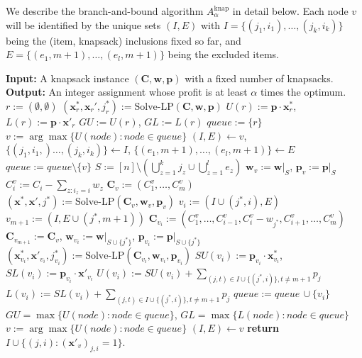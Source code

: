 \documentclass[a4paper,UKenglish,cleveref, autoref, thm-restate, pdfa]{lipics-v2021}
\theoremstyle{plain}
\begin{document}
We describe the branch-and-bound algorithm $A^{\text{knap}}_{\alpha}$ in detail below. Each node $v$ will be identified by the unique sets $(I, E)$ with $I = \{(j_1,i_1), \ldots, (j_k, i_k)\}$ being the (item, knapsack) inclusions fixed so far, and $E=\{(e_1,m+1), \ldots, (e_l,m+1)\}$ being the excluded items.

\begin{algorithm}
\caption{$A^{\text{knap}}_{\alpha}$}
\label{alg:knapsack}
\begin{algorithmic}[1]
    \State \textbf{Input:} A knapsack instance $(\bm{C}, \bm{w}, \bm{p})$ with a fixed number of knapsacks.
    \State \textbf{Output:} An integer assignment whose profit is at least $\alpha$ times the optimum.
    \State $r := (\emptyset, \emptyset)$
    \State $(\bm{x}^* _r, \bm{x}_r ', j^* _r) := \text{Solve-LP}(\bm{C, \bm{w}, \bm{p}})$
    \State $U(r):= \bm{p}\cdot \bm{x}^* _r$, $L(r):= \bm{p}\cdot \bm{x}' _r$
    \State $GU := U(r)$, $GL := L(r)$
    \State $queue :=  \{r\}$
        \State $v := \arg\max \{U(node): node \in queue\}$
        \State $(I, E) \leftarrow v$, $\{(j_1, i_1, )\ldots, (j_k, i_k)\} \leftarrow I$, $\{(e_1, m+1), \ldots, (e_l, m+1)\} \leftarrow E$
        \State $queue := queue \setminus \{v\}$
        \State $S := [n]\setminus \left(\bigcup_{z=1}^k j_z \cup \bigcup_{z=1}^l e_z\right)$
        \State $\bm{w}_v := \bm{w}|_{S}$, $\bm{p}_v := \bm{p}|_{S}$
            \State $C^v_i := C_i - \sum\limits_{z: i_z = i} w_z$
        \EndFor
        \State $\bm{C}_v := (C^v _1, \ldots, C^v _m)$
        \State $(\bm{x^*}, \bm{x}', j^*):= \text{Solve-LP}(\bm{C}_v, \bm{w}_v, \bm{p}_v)$
            \State $v_i := (I\cup (j^*, i), E)$
        \EndFor
        \State $v_{m+1} := (I, E\cup (j^*, m+1))$
            \State $\bm{C}_{v_i} := (C^v _1, \ldots, C^v _{i-1}, C^v_i - w_{j^*}, C^v_{i+1}, \ldots, C^v_m)$
        \EndFor
        \State $\bm{C}_{v_{m+1}} := \bm{C}_v$, 
            \State $\bm{w}_{v_i} := \bm{w} |_{S \cup \{j^*\}}$, $\bm{p}_{v_i} := \bm{p} |_{S \cup \{j^*\}}$
            \State $(\bm{x}^* _{v_i}, \bm{x}' _{v_i}, j^*_{v_i}) := \text{Solve-LP}(\bm{C}_{v_i}, \bm{w}_{v_i}, \bm{p}_{v_i})$
            \State $SU(v_i) := \bm{p}_{v_i} \cdot \bm{x}^* _{v_i}$, $SL(v_i) := \bm{p}_{v_i} \cdot \bm{x}' _{v_i}$
            \State $U(v_i) := SU(v_i) + \sum\limits_{(j,t) \in I \cup \{(j^*, i)\}, t \ne m+1} p_j$
            \State $L(v_i) := SL(v_i) + \sum\limits_{(j,t) \in I \cup \{(j^*, i)\}, t \ne m+1} p_j$
                \State $queue := queue \,\cup \{v_i\}$
            \EndIf
        \EndFor
        \State $GU = \max\{U(node): node \in queue\}$, $GL = \max\{L(node): node \in queue\}$
    \EndWhile
    \State $v := \arg\max \{U(node): node \in queue\}$
    \State $(I,E) \leftarrow v$
    \State \textbf{return} $I \cup \{(j,i): (\bm{x}'_v)_{j,i}=1\}$.
\end{algorithmic}
\end{algorithm}

 
\end{document}
